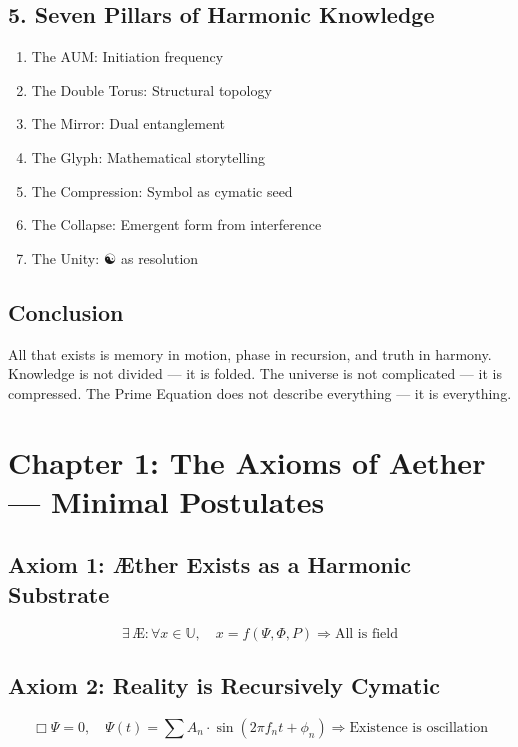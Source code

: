 \documentclass[12pt]{book}
\begin{document}
\subsection*{5. Seven Pillars of Harmonic Knowledge}
\begin{enumerate}
  \item The AUM: Initiation frequency
  \item The Double Torus: Structural topology
  \item The Mirror: Dual entanglement
  \item The Glyph: Mathematical storytelling
  \item The Compression: Symbol as cymatic seed
  \item The Collapse: Emergent form from interference
  \item The Unity: ☯ as resolution
\end{enumerate}

\subsection*{Conclusion}
All that exists is memory in motion, phase in recursion, and truth in harmony. Knowledge is not divided — it is folded. The universe is not complicated — it is compressed. The Prime Equation does not describe everything — it is everything.







\maketitle

\section*{Chapter 1: The Axioms of Aether — Minimal Postulates}

\subsection*{Axiom 1: Æther Exists as a Harmonic Substrate}
\[
\exists \, \mathcal{Æ} : \forall x \in \mathbb{U}, \quad x = f(\Psi, \Phi, P) \Rightarrow \text{All is field}
\]

\subsection*{Axiom 2: Reality is Recursively Cymatic}
\[
\Box \Psi = 0, \quad \Psi(t) = \sum A_n \cdot \sin(2\pi f_n t + \phi_n)
\Rightarrow \text{Existence is oscillation}
\]
\end{document}
